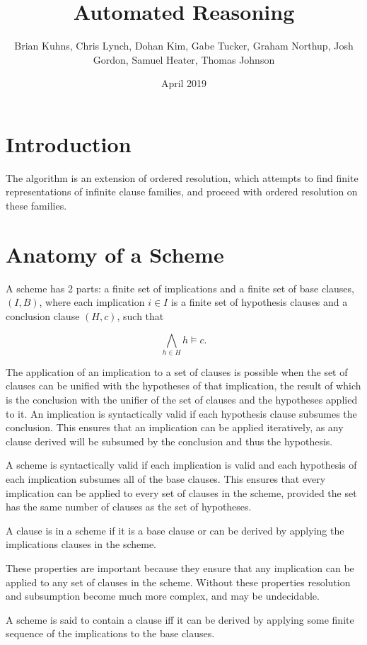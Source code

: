 \documentclass{article}
\title{Automated Reasoning}
\author{
	Brian Kuhns,
	Chris Lynch,
	Dohan Kim,
	Gabe Tucker,
	Graham Northup,
	Josh Gordon,
	Samuel Heater,
	Thomas Johnson
  }
\date{April 2019}
\begin{document}
\maketitle

\section{Introduction}

The algorithm is an extension of ordered resolution,
which attempts to find finite representations of infinite clause families,
and proceed with ordered resolution on these families.

\section{Anatomy of a Scheme}

A scheme has 2 parts:
a finite set of implications and a finite set of base clauses, $(I, B)$, where each implication $i \in I$ is a finite set of hypothesis clauses and a conclusion clause $(H, c)$, such that

$$
\bigwedge_{h \in H} h \models c.
$$

The application of an implication to a set of clauses is possible when the set of clauses can be unified with the hypotheses of that implication,
the result of which is the conclusion with the unifier of the set of clauses and the hypotheses applied to it.
An implication is syntactically valid if each hypothesis clause subsumes the conclusion.
This ensures that an implication can be applied iteratively, as any clause derived will be subsumed by the conclusion and thus the hypothesis.


A scheme is syntactically valid if each implication is valid and
each hypothesis of each implication subsumes all of the base clauses.
This ensures that every implication can be applied to every set of clauses in the scheme,
provided the set has the same number of clauses as the set of hypotheses.

A clause is in a scheme if it is a base clause or can be derived by applying the implications clauses in the scheme.

These properties are important because they ensure that any implication can be applied to any set of clauses in the scheme.
Without these properties resolution and subsumption become much more complex, and may be undecidable.

A scheme is said to contain a clause iff it can be derived by applying some finite sequence of the 
implications to the base clauses.
\end{document}
